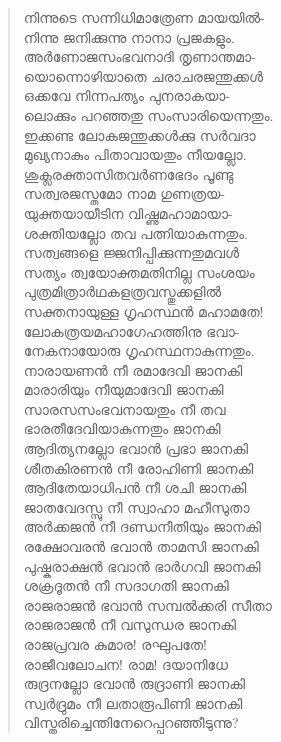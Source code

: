 \begin{verse}
നിന്നുടെ സന്നിധിമാത്രേണ മായയില്‍-\\
നിന്നു ജനിക്കുന്നു നാനാ പ്രജകളും.\\
അര്‍ണോജസംഭവനാദി തൃണാന്തമാ-\\
യൊന്നൊഴിയാതെ ചരാചരജന്തുക്കള്‍\\
ഒക്കവേ നിന്നപത്യം പുനരാകയാ-\\
ലൊക്കും പറഞ്ഞതു സംസാരിയെന്നതും.\\
ഇക്കണ്ട ലോകജന്തുക്കള്‍ക്കു സര്‍വദാ\\
മുഖ്യനാകും പിതാവായതും നീയല്ലോ.\\
ശുക്ലരക്താസിതവര്‍ണഭേദം പൂണ്ടു\\
സത്വരജസ്തമോ നാമ ഗുണത്രയ-\\
യുക്തയായീടിന വിഷ്ണുമഹാമായാ-\\
ശക്തിയല്ലോ തവ പത്നിയാകുന്നതും.\\
സത്വങ്ങളെ ജ്ജനിപ്പിക്കുന്നതുമവള്‍\\
സത്യം ത്വയോക്തമതിനില്ല സംശയം\\
പുത്രമിത്രാര്‍ഥകളത്രവസ്തുക്കളില്‍\\
സക്തനായുള്ള ഗൃഹസ്ഥന്‍ മഹാമതേ!\\
ലോകത്രയമഹാഗേഹത്തിനു ഭവാ-\\
നേകനായോരു ഗൃഹസ്ഥനാകുന്നതും.\\
നാരായണന്‍ നീ രമാദേവി ജാനകി\\
മാരാരിയും നീയുമാദേവി ജാനകി\\
സാരസസംഭവനായതും നീ തവ\\
ഭാരതീദേവിയാകുന്നതും ജാനകി\\
ആദിത്യനല്ലോ ഭവാന്‍ പ്രഭാ ജാനകി\\
ശീതകിരണന്‍ നീ രോഹിണി ജാനകി\\
ആദിതേയാധിപന്‍ നീ ശചി ജാനകി\\
ജാതവേദസ്സു നീ സ്വാഹാ മഹീസുതാ\\
അര്‍ക്കജന്‍ നീ ദണ്ഡനീതിയും ജാനകി\\
രക്ഷോവരന്‍ ഭവാന്‍ താമസി ജാനകി\\
പുഷ്കരാക്ഷന്‍ ഭവാന്‍ ഭാര്‍ഗവി ജാനകി\\
ശക്രദൂതന്‍ നീ സദാഗതി ജാനകി\\
രാജരാജന്‍ ഭവാന്‍ സമ്പല്‍ക്കരി സീതാ\\
രാജരാജന്‍ നീ വസുന്ധര ജാനകി\\
രാജപ്രവര കുമാര! രഘുപതേ!\\
രാജീവലോചന! രാമ! ദയാനിധേ\\
രുദ്രനല്ലോ ഭവാന്‍ രുദ്രാണി ജാനകി\\
സ്വര്‍ദ്രുമം നീ ലതാരൂപിണി ജാനകി\\
വിസ്തരിച്ചെന്തിനേറെപ്പറഞ്ഞീടുന്നു?\\

\end{verse}

